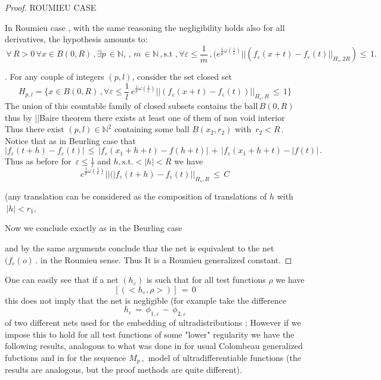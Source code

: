 \documentclass[12pt,a4paper]{amsart}
\newcommand{\NN}{\mathbb N}
\begin{document}
\begin{proof}
ROUMIEU CASE


In Roumieu case  , with the same reasoning the negligibility holds also for all derivatives, the hypothesis amounts to:
$$\,\forall\, R>0 \,\forall x \in B(0,R)\,,\exists p\,\in \NN,  \,,\,m\,\in \NN\,,
\mbox{s.t}\,
\,,\forall \varepsilon\leq \frac{1}{m}\,,
(e^{\frac{1}{p}\omega(\frac{1}{\varepsilon})}
||(f_\varepsilon(x+t)-f_\varepsilon (t) ||_{H_s,2R})\leq\,1.$$


.
For any couple of integers $(p,l)$, consider the set closed  set 
$$H_{p,l}= \{x\in B(0,R)\,,\forall\varepsilon \leq \frac{1}{l}\,e^{\frac{1}{p}\omega(\frac{1}{\varepsilon})}
||(f_\varepsilon(x+t)-f_\varepsilon (t))||_{H_s,R}\,\leq\,1\}$$
The union of this countable family of closed  subsets  contains the ball$\,B(0,R)\,$
thus by ||Baire theorem there exists at least one of them of non void interior 
Thus there exist $(p,l) \in \NN^2$ containing some ball
$B(x_2, r_2)$ with $\,r_2<R\,.$  Notice that  as in Beurling case that  
$$|f_\varepsilon (t+h)-f_\varepsilon(t)|\,\leq\,
|f_\varepsilon(x_1+h+t)-f(h+t)|
\,+\,|f_\varepsilon (x_1+h+t)-|f(t)|\,.$$
Thus as before 
for $\,\varepsilon\leq \frac{1}{l}$ and $h, \mbox{s.t.} <|h|<R$
we have $$
e^{\frac{1}{p}\omega(\frac{1}{\varepsilon})}||(|f_\varepsilon (t+h)-f_\varepsilon(t)||_{H_s,R}\,\leq\,C  $$

 (any translation can be considered as the composition of translations of $h$ with $\,|h|<r_1,$

Now we conclude exactly as in the Beurling case 

 and by the same arguments  conclude thar the net is equivalent to the net $(f_\varepsilon(o)\,.$ in the Roumieu sense.
Thus It is a Roumieu  generalized constant.

\end{proof}


 One can easily see that if a net $(h_\varepsilon)$
  is such that for all test functions $\rho$
  we have $$[(<h_\varepsilon,\rho>)]\,=\,0$$ this does not imply that the net is negligible (for example take the difference $$ h_\varepsilon \,= \,
  \phi_{1, \varepsilon}\,- \,\phi_{2,\varepsilon}$$
   of two different nets used for the embedding of ultradistributions ; However if we impose this to hold 
   for all test functions  of some "lower" regularity we have the following results, analogous to what was done in 
   \cite{P.S.V.} for usual Colombeau generalized fubctions and in \cite{P.R.S.Z} for the sequence $M_p\,,$ model of ultradifferentiable functions (the results are analogous, but the proof methods are quite different).
 
\end{document}
